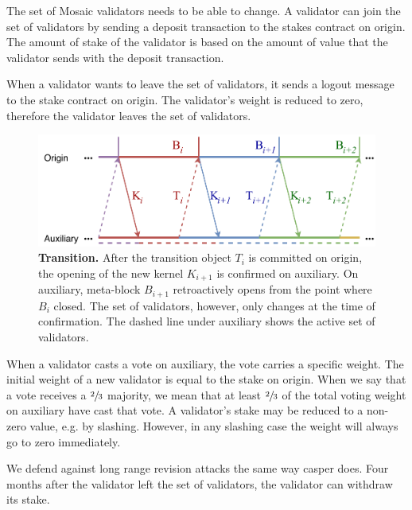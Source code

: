 \documentclass[12pt,a4paper]{article}
\begin{document}
The set of Mosaic validators needs to be able to change.
A validator can join the set of validators by sending a deposit transaction to the stakes contract on origin.
The amount of stake of the validator is based on the amount of value that the validator sends with the deposit transaction.

When a validator wants to leave the set of validators, it sends a logout message to the stake contract on origin.
The validator's weight is reduced to zero, therefore the validator leaves the set of validators.

\begin{figure}[htb]
    \centering
	\includegraphics[width=\textwidth]{transition}
	\caption{\textbf{Transition.}
		After the transition object $T_i$ is committed on origin, the opening of the new kernel $K_{i+1}$ is confirmed on auxiliary.
		On auxiliary, meta-block $B_{i+1}$ retroactively opens from the point where $B_i$ closed.
		The set of validators, however, only changes at the time of confirmation.
		The dashed line under auxiliary shows the active set of validators.
	}
	\label{fig:transition}
\end{figure}

When a validator casts a vote on auxiliary, the vote carries a specific weight.
The initial weight of a new validator is equal to the stake on origin.
When we say that a vote receives a $\sfrac{2}{3}$ majority, we mean that at least $\sfrac{2}{3}$ of the total voting weight on auxiliary have cast that vote.
A validator's stake may be reduced to a non-zero value, e.g. by slashing.
However, in any slashing case the weight will always go to zero immediately.

We defend against long range revision attacks the same way casper does.
Four months after the validator left the set of validators, the validator can withdraw its stake.
\end{document}
